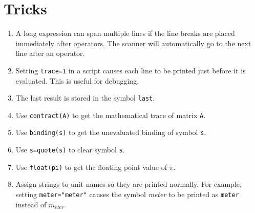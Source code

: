 \section{Tricks}
\begin{enumerate}

\item
A long expression can span multiple lines
if the line breaks are placed immediately after operators.
The scanner will automatically go to the next line after an operator.

\item
Setting \verb$trace=1$ in a script causes each line to be printed just before it is evaluated.
This is useful for debugging.

\item
The last result is stored in the symbol \verb$last$.

\item
Use \verb$contract(A)$ to get the mathematical trace of matrix \verb$A$.

\item
Use \verb$binding(s)$ to get the unevaluated binding of symbol \verb$s$.

\item
Use \verb$s=quote(s)$ to clear symbol \verb$s$.

\item
Use \verb$float(pi)$ to get the floating point value of $\pi$.

\item
Assign strings to unit names so they are printed normally.
For example, setting \verb$meter="meter"$ causes the symbol {\it meter}
to be printed as \verb$meter$ instead of $m_{eter}$.

\end{enumerate}
